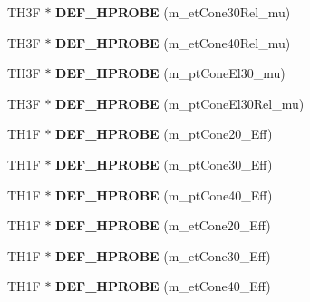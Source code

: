 \begin{DoxyCompactItemize}
\item 
\hypertarget{classHistos__Fake_aa1062f71a43d6ee435d29e6cca65f7dd}{
TH3F $\ast$ {\bfseries DEF\_\-HPROBE} (m\_\-etCone30Rel\_\-mu)}
\label{classHistos__Fake_aa1062f71a43d6ee435d29e6cca65f7dd}

\item 
\hypertarget{classHistos__Fake_a059a7aa8a86a45042ea865d980e429a0}{
TH3F $\ast$ {\bfseries DEF\_\-HPROBE} (m\_\-etCone40Rel\_\-mu)}
\label{classHistos__Fake_a059a7aa8a86a45042ea865d980e429a0}

\item 
\hypertarget{classHistos__Fake_ac8c848231e377d5b58c14356f3c55b40}{
TH3F $\ast$ {\bfseries DEF\_\-HPROBE} (m\_\-ptConeEl30\_\-mu)}
\label{classHistos__Fake_ac8c848231e377d5b58c14356f3c55b40}

\item 
\hypertarget{classHistos__Fake_aa13ffc28453f532ff28b8229c78f9dbb}{
TH3F $\ast$ {\bfseries DEF\_\-HPROBE} (m\_\-ptConeEl30Rel\_\-mu)}
\label{classHistos__Fake_aa13ffc28453f532ff28b8229c78f9dbb}

\item 
\hypertarget{classHistos__Fake_aed555fc809ee53624007a590a5fa80db}{
TH1F $\ast$ {\bfseries DEF\_\-HPROBE} (m\_\-ptCone20\_\-Eff)}
\label{classHistos__Fake_aed555fc809ee53624007a590a5fa80db}

\item 
\hypertarget{classHistos__Fake_a0b626ad3f556008f241fdc7ac89339cb}{
TH1F $\ast$ {\bfseries DEF\_\-HPROBE} (m\_\-ptCone30\_\-Eff)}
\label{classHistos__Fake_a0b626ad3f556008f241fdc7ac89339cb}

\item 
\hypertarget{classHistos__Fake_a9902ac637026b149f4ced35d9476266a}{
TH1F $\ast$ {\bfseries DEF\_\-HPROBE} (m\_\-ptCone40\_\-Eff)}
\label{classHistos__Fake_a9902ac637026b149f4ced35d9476266a}

\item 
\hypertarget{classHistos__Fake_a739cfefc87c25338aadb9d16ffb63bf6}{
TH1F $\ast$ {\bfseries DEF\_\-HPROBE} (m\_\-etCone20\_\-Eff)}
\label{classHistos__Fake_a739cfefc87c25338aadb9d16ffb63bf6}

\item 
\hypertarget{classHistos__Fake_a9a120c8b5ef60d0ac123c4cbe1ba58dd}{
TH1F $\ast$ {\bfseries DEF\_\-HPROBE} (m\_\-etCone30\_\-Eff)}
\label{classHistos__Fake_a9a120c8b5ef60d0ac123c4cbe1ba58dd}

\item 
\hypertarget{classHistos__Fake_aaec8b91524faea14e2bbbcb29ac988cf}{
TH1F $\ast$ {\bfseries DEF\_\-HPROBE} (m\_\-etCone40\_\-Eff)}
\label{classHistos__Fake_aaec8b91524faea14e2bbbcb29ac988cf}


\end{DoxyCompactItemize}
